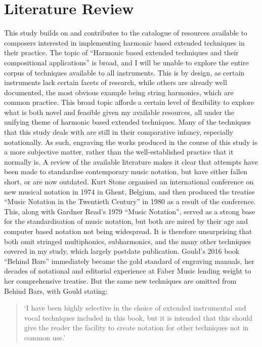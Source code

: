 \newpage
\section{Literature Review}
This study builds on and contributes to the catalogue of resources available to composers interested in implementing harmonic based extended techniques in their practice. The topic of “Harmonic based extended techniques and their compositional applications” is broad, and I will be unable to explore the entire corpus of techniques available to all instruments. This is by design, as certain instruments lack certain facets of research, while others are already well documented, the most obvious example being string harmonics, which are common practice. This broad topic affords a certain level of flexibility to explore what is both novel and feasible given my available resources, all under the unifying theme of harmonic based extended techniques.
Many of the techniques that this study deals with are still in their comparative infancy, especially notationally. As such, engraving the works produced in the course of this study is a more subjective matter, rather than the well-established practice that it normally is. A review of the available literature makes it clear that attempts have been made to standardise contemporary music notation, but have either fallen short, or are now outdated. Kurt Stone organised an international conference on new musical notation in 1974 in Ghent, Belgium, and then produced the treatise “Music Notation in the Twentieth Century” in 1980 as a result of the conference.\autocite[xiii]{stoneMusicNotationTwentieth1980}  This, along with Gardner Read’s 1979 “Music Notation”, served as a strong base for the standardisation of music notation, but both are mired by their age and computer based notation not being widespread.\autocite{readCompendiumModernInstrumental1993} It is therefore unsurprising that both omit stringed multiphonics, subharmonics, and the many other techniques covered in my study, which largely postdate publication. Gould’s 2016 book “Behind Bars” immediately became the gold standard of engraving manuals, her decades of notational and editorial experience at Faber Music lending weight to her comprehensive treatise. But the same new techniques are omitted from Behind Bars, with Gould stating: 
\begin{quotation}
    ‘I have been highly selective in the choice of extended instrumental and vocal techniques included in this book, but it is intended that this should give the reader the facility to create notation for other techniques not in common use.’\autocite[iii]{gouldBars2011} 
\end{quotation}
